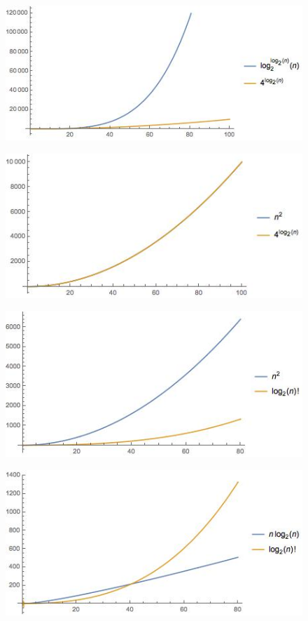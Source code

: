 \documentclass[11 pt, a4paper]{article}
\theoremstyle{definition}
\begin{document}
\begin{enumerate}
\begin{figure}[H]
         \centering
          \includegraphics[trim=0cm 0cm 0cm 0cm, width=12cm]{10.jpg} 
      \end{figure} \begin{figure}[H]
         \centering
          \includegraphics[trim=0cm 0cm 0cm 0cm, width=12cm]{11.jpg} 
      \end{figure} \begin{figure}[H]
         \centering
          \includegraphics[trim=0cm 0cm 0cm 0cm, width=12cm]{12.jpg} 
      \end{figure} \begin{figure}[H]
         \centering
          \includegraphics[trim=0cm 0cm 0cm 0cm, width=12cm]{13.jpg} 

\end{figure}
\end{enumerate}
\end{document}
